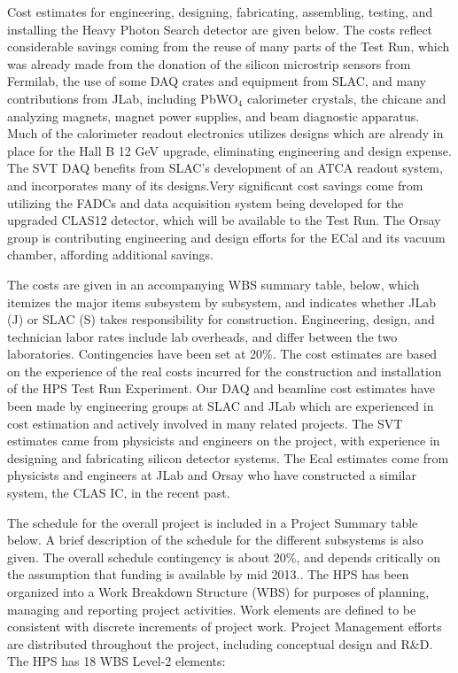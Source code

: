 \label{sec:schcost}

Cost estimates for engineering, designing, fabricating, assembling, testing, and installing the Heavy Photon Search detector are given below. The costs reflect considerable savings coming from the reuse of many parts of the Test Run, which was already made from the donation of the silicon microstrip sensors from Fermilab, the use of some DAQ crates and equipment from SLAC, and many contributions from JLab, including PbWO$_4$ calorimeter crystals, the chicane and analyzing magnets, magnet power supplies, and beam diagnostic apparatus. Much of the calorimeter readout electronics utilizes designs which are already in place for the Hall B 12 GeV upgrade, eliminating engineering and design expense. The SVT DAQ benefits from SLAC's development of an ATCA readout system, and incorporates many of its designs.Very significant cost savings come from utilizing the FADCs and data acquisition system being developed for the upgraded CLAS12 detector, which will be available to the Test Run. The Orsay group is contributing engineering and design efforts for the ECal and its vacuum chamber, affording additional savings. 

The costs are given in an accompanying WBS summary table, below, which itemizes the major items subsystem by subsystem, and indicates whether JLab (J) or SLAC (S) takes responsibility for construction. Engineering, design, and technician labor rates include lab overheads, and differ between the two laboratories. Contingencies have been set at 20\%. The cost estimates are based on the experience of the real costs incurred for the construction and installation of the HPS Test Run Experiment. Our DAQ and beamline cost estimates have been made by engineering groups at SLAC and JLab which are experienced in cost estimation and actively involved in many related projects. The SVT estimates came from physicists and engineers on the project, with experience in designing and fabricating silicon detector systems. The Ecal estimates come from physicists and engineers at JLab and Orsay who have constructed a similar system, the CLAS IC, in the recent past. 

The schedule for the overall project is included in a Project Summary table below. A brief description of the schedule for the different subsystems is also given. The overall schedule contingency is about 20\%, and depends critically on the assumption that funding is available by mid 2013.. The HPS has been organized into a Work Breakdown Structure (WBS) for purposes of planning, managing and reporting project activities. Work elements are defined to be consistent with discrete increments of project work. Project Management efforts are distributed throughout the project, including conceptual design and R\&D. The HPS has 18 WBS Level-2 elements: 

